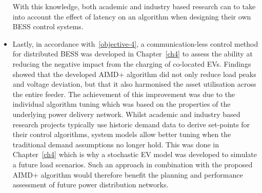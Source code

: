 \begin{itemize}
	With this knowledge, both academic and industry based research can to take into account the effect of latency on an algorithm when designing their own BESS control systems.
	\item
	Lastly, in accordance with \ref{objective-4}, a communication-less control method for distributed BESS was developed in Chapter~\ref{ch4} to assess the ability at reducing the negative impact from the charging of co-located EVs.
	Findings showed that the developed AIMD+ algorithm did not only reduce load peaks and voltage deviation, but that it also harmonised the asset utilisation across the entire feeder.
	The achievement of this improvement was due to the individual algorithm tuning which was based on the properties of the underlying power delivery network.
	Whilst academic and industry based research projects typically use historic demand data to derive set-points for their control algorithms, system models allow better tuning when the traditional demand assumptions no longer hold.
	This was done in Chapter~\ref{ch4} which is why a stochastic EV model was developed to simulate a future load scenarios.
	Such an approach in combination with the proposed AIMD+ algorithm would therefore benefit the planning and performance assessment of future power distribution networks.
\end{itemize}







